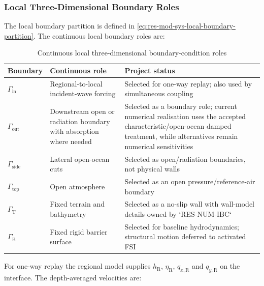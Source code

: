 \subsubsection{Local Three-Dimensional Boundary Roles}
\label{sec:res-mod-ibc-local-boundary-roles}

The local boundary partition is defined in
\cref{eq:res-mod-sys-local-boundary-partition}. The continuous local
boundary roles are:

\begin{table}[htbp]
  \centering
  \small
  \renewcommand{\arraystretch}{1.2}
  \begin{tabular}{
      p{}
      p{}
      p{}
    }
    \hline
    Boundary
    &
    Continuous role
    &
    Project status
    \\
    \hline
    $\Gamma_{\mathrm{in}}$
    &
    Regional-to-local incident-wave forcing
    &
    Selected for one-way replay; also used by simultaneous coupling
    \\
    $\Gamma_{\mathrm{out}}$
    &
    Downstream open or radiation boundary with absorption where needed
    &
    Selected as a boundary role; current numerical realisation uses the
    accepted characteristic/open-ocean damped treatment, while
    alternatives remain numerical sensitivities
    \\
    $\Gamma_{\mathrm{side}}$
    &
    Lateral open-ocean cuts
    &
    Selected as open/radiation boundaries, not physical walls
    \\
    $\Gamma_{\mathrm{top}}$
    &
    Open atmosphere
    &
    Selected as an open pressure/reference-air boundary
    \\
    $\Gamma_{\mathrm{T}}$
    &
    Fixed terrain and bathymetry
    &
    Selected as a no-slip wall with wall-model details owned by
    `RES-NUM-IBC`
    \\
    $\Gamma_{\mathrm{B}}$
    &
    Fixed rigid barrier surface
    &
    Selected for baseline hydrodynamics; structural motion deferred
    to activated FSI
    \\
    \hline
  \end{tabular}
  \caption{Continuous local three-dimensional boundary-condition roles}
  \label{tab:res-mod-ibc-local-boundary-roles}
\end{table}

For one-way replay the regional model supplies
$h_{\mathrm{R}}$, $\eta_{\mathrm{R}}$, $q_{x,\mathrm{R}}$ and
$q_{y,\mathrm{R}}$ on the interface. The depth-averaged velocities are:

